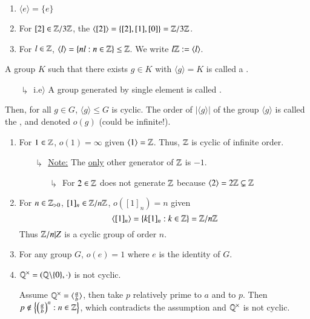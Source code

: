 \documentclass[12pt, a4paper, twoside, openright, titlepage]{book}
\begin{document}
\begin{eg}{}{}
    \leavevmode
    \begin{enumerate}
        \item $\langle e \rangle = \{e\}$
        \item For $[2] \in \mathbb Z/3\mathbb Z$, the $\langle [2] \rangle = \{[2], [1], [0]\} = \mathbb Z/3\mathbb Z$.
        \item For $l \in \mathbb Z$, $\langle l \rangle = \{nl:n\in\mathbb Z\}\leq \mathbb Z$. We write $l\mathbb Z := \langle l \rangle$.
    \end{enumerate}
\end{eg}

\begin{defn}{}{}
    A group $K$ such that there exists $g \in K$ with $\langle g \rangle = K$ is called a .
\end{defn}
\begin{enumerate}
    \item[$\drsh$] i.e$\rangle$ A group generated by single element is called .
\end{enumerate}


\begin{defn}{}{}
    Then, for all $g \in G$, $\langle g \rangle \leq G$ is cyclic. The order of $|\langle g \rangle|$ of the group $\langle g \rangle$ is called the , and denoted $o(g)$ (could be infinite!).
\end{defn}


\begin{eg}{}{}
    \leavevmode
    \begin{enumerate}
        \item For $1 \in \mathbb Z$, $o(1) = \infty$ given $\langle 1 \rangle = \mathbb Z$. Thus, $\mathbb Z$ is cyclic of infinite order.
        \begin{enumerate}
            \item[$\drsh$] \underline{Note:} The \underline{only} other generator of $\mathbb Z$ is $-1$.
            \begin{enumerate}
                \item[$\drsh$] For $2 \in \mathbb Z$ does not generate $\mathbb Z$ because $\langle 2 \rangle = 2\mathbb Z \subsetneq \mathbb Z$ 
            \end{enumerate}
        \end{enumerate}
        \item For $n \in \mathbb Z_{>0}$, $[1]_n \in \mathbb Z/n\mathbb Z$, $o([1]_n) = n$ given $$\langle [1]_n\rangle = \{k[1]_n:k \in \mathbb Z\} = \mathbb Z/n\mathbb Z$$
        Thus $\mathbb Z/n|Z$ is a cyclic group of order $n$.
        \item For any group $G$, $o(e) = 1$ where $e$ is the identity of $G$.
        \item $\mathbb Q^{\times} = (\mathbb Q\backslash\{0\},\cdot)$ is not cyclic.
        \begin{proof*}{}{}
            Assume $\mathbb Q^{\times} = \langle \frac{a}{b}\rangle$, then take $p$ relatively prime to $a$ and to $p$. Then $p \notin \left\{\left(\frac{a}{b}\right)^n: n \in \mathbb Z\right\}$, which contradicts the assumption and $\mathbb Q^{\times}$ is not cyclic.
        \end{proof*}
    \end{enumerate}
\end{eg}
\end{document}
